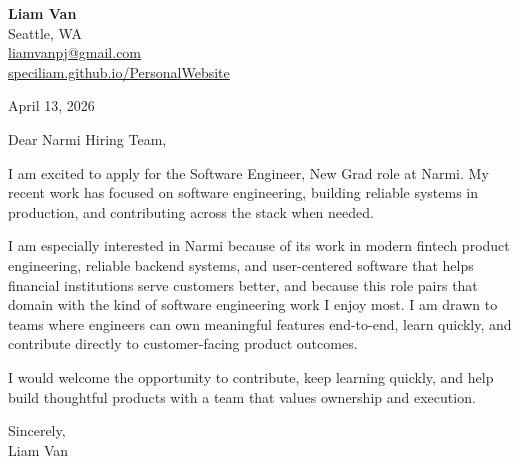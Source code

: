 \documentclass[letterpaper,11pt]{article}
\begin{document}
\begin{flushleft}
\textbf{\Large Liam Van} \\
Seattle, WA \\
\href{mailto:liamvanpj@gmail.com}{liamvanpj@gmail.com} \\
\href{https://speciliam.github.io/PersonalWebsite}{speciliam.github.io/PersonalWebsite}
\end{flushleft}

April 13, 2026

\noindent Dear Narmi Hiring Team,

\noindent I am excited to apply for the Software Engineer, New Grad role at Narmi. My recent work has focused on software engineering, building reliable systems in production, and contributing across the stack when needed.

\noindent I am especially interested in Narmi because of its work in modern fintech product engineering, reliable backend systems, and user-centered software that helps financial institutions serve customers better, and because this role pairs that domain with the kind of software engineering work I enjoy most. I am drawn to teams where engineers can own meaningful features end-to-end, learn quickly, and contribute directly to customer-facing product outcomes.

\noindent I would welcome the opportunity to contribute, keep learning quickly, and help build thoughtful products with a team that values ownership and execution.

\noindent Sincerely, \\
Liam Van
\end{document}
